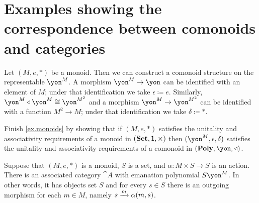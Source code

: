\documentclass[Book-Poly]{subfiles}
\begin{document}
\section{Examples showing the correspondence between comonoids and categories}

\begin{example}[Monoids]\label{ex.monoids}
Let $(M,e,*)$ be a monoid. Then we can construct a comonoid structure on the representable $\yon^M$. A morphism $\yon^M\to\yon$ can be identified with an element of $M$; under that identification we take $\epsilon\coloneqq e$. Similarly, $\yon^M\tri\yon^M\cong\yon^{M^2}$ and a morphism $\yon^M\to\yon^{M^2}$ can be identified with a function $M^2\to M$; under that identification we take $\delta\coloneqq *$.
\end{example}

\begin{exercise}
Finish \cref{ex.monoids} by showing that if $(M,e,*)$ satisfies the unitality and associativity requirements of a monoid in $(\mathbf{Set},\textsf{1},\times)$ then $(\yon^M,\epsilon,\delta)$ satisfies the unitality and associativity requirements of a comonoid in $(\poly,\yon,\tri)$.
\end{exercise}


\begin{example}\label{ex.monoid_action}
Suppose that $(M,e,*)$ is a monoid, $S$ is a set, and $\alpha \colon M \times S \to S$ is an action. There is an associated category $\cat{A}$ with emanation polynomial $S \yon ^ M$. In other words, it has objects set $S$ and for every $s \in S$ there is an outgoing morphism for each $m \in M$, namely $s \xrightarrow{m} \alpha (m , s)$. 
\end{example}
\end{document}
